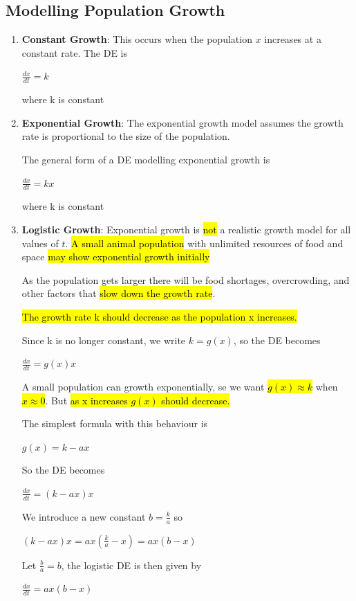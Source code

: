 \documentclass{article}
\begin{document}
    \subsection{Modelling Population Growth}
      \begin{enumerate}
        \item \textbf{Constant Growth}: This occurs when the population $x$ increases at a constant rate. The DE is 
          \begin{center}
            $\frac{dx}{dt} = k$
          \end{center}
          where k is constant

        \item \textbf{Exponential Growth}: The exponential growth model assumes the growth rate is proportional to the size of the population.

        The general form of a DE modelling exponential growth is 
          \begin{center}
            $\frac{dx}{dt} = kx$
          \end{center}
          where k is constant

        \item \textbf{Logistic Growth}: Exponential growth is \hl{not} a realistic growth model for all values of $t$. \hl{A small animal population} with unlimited resources of food and space \hl{may show exponential growth initially}

        As the population gets larger there will be food shortages, overcrowding, and other factors that \hl{slow down the growth rate}.

        \hl{The growth rate k should decrease as the population x increases.}

        Since k is no longer constant, we write $k=g(x)$, so the DE becomes 
          \begin{center}
            $\frac{dx}{dt} = g(x)x$
          \end{center}

        A small population can growth exponentially, se we want \hl{$g(x) \approx k$} when \hl{$x \approx 0$}. But \hl{as x increases $g(x)$ should decrease.}

        The simplest formula with this behaviour is 
          \begin{center}
            $g(x) = k - ax$
          \end{center}

        So the DE becomes 
          \begin{center}
            $\frac{dx}{dt} = (k-ax)x$
          \end{center}

        We introduce a new constant $b = \frac{k}{a}$ so
          \begin{center}
            $(k-ax)x = ax (\frac{k}{a}-x) = ax(b-x)$
          \end{center}

        Let $\frac{b}{a} = b$, the logistic DE is then given by

          \begin{center}
            $\frac{dx}{dt} = ax(b-x)$
          \end{center}
      \end{enumerate}
\end{document}
